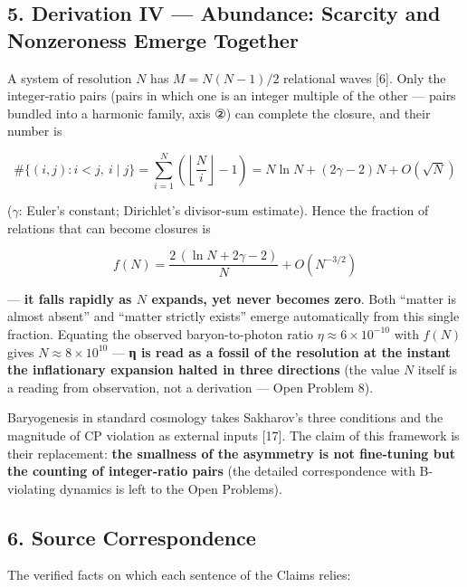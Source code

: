\documentclass[
  a4paper,
]{article}
\begin{document}
\subsection{5. Derivation IV --- Abundance: Scarcity and Nonzeroness
Emerge
Together}\label{derivation-iv-abundance-scarcity-and-nonzeroness-emerge-together}

A system of resolution \(N\) has \(M=N(N-1)/2\) relational waves
{[}6{]}. Only the integer-ratio pairs (pairs in which one is an integer
multiple of the other --- pairs bundled into a harmonic family, axis ②)
can complete the closure, and their number is

\[
\#\{(i,j):i<j,\ i\mid j\}=\sum_{i=1}^{N}\left(\left\lfloor\frac{N}{i}\right\rfloor-1\right)=N\ln N+(2\gamma-2)N+O(\sqrt N)
\]

(\(\gamma\): Euler's constant; Dirichlet's divisor-sum estimate). Hence
the fraction of relations that can become closures is

\[
f(N)=\frac{2\,(\ln N+2\gamma-2)}{N}+O(N^{-3/2})
\]

--- \textbf{it falls rapidly as \(N\) expands, yet never becomes zero}.
Both ``matter is almost absent'' and ``matter strictly exists'' emerge
automatically from this single fraction. Equating the observed
baryon-to-photon ratio \(\eta\approx6\times10^{-10}\) with \(f(N)\)
gives \(N\approx8\times10^{10}\) --- \textbf{η is read as a fossil of
the resolution at the instant the inflationary expansion halted in three
directions} (the value \(N\) itself is a reading from observation, not a
derivation --- Open Problem 8).

Baryogenesis in standard cosmology takes Sakharov's three conditions and
the magnitude of CP violation as external inputs {[}17{]}. The claim of
this framework is their replacement: \textbf{the smallness of the
asymmetry is not fine-tuning but the counting of integer-ratio pairs}
(the detailed correspondence with B-violating dynamics is left to the
Open Problems).

\subsection{6. Source Correspondence}\label{source-correspondence}

The verified facts on which each sentence of the Claims relies:
\end{document}
